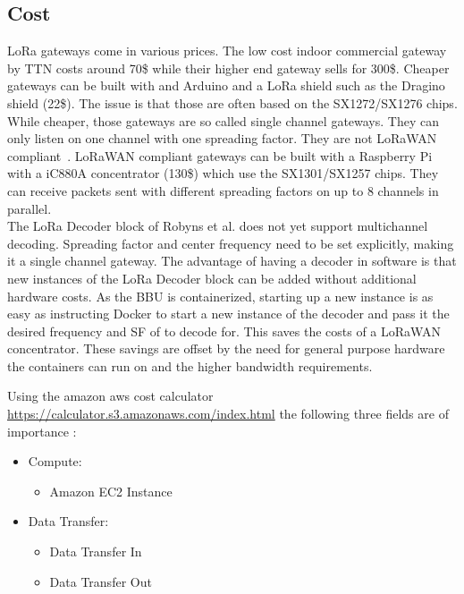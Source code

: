 \subsection{Cost}
LoRa gateways come in various prices. The low cost indoor commercial gateway by TTN costs around 70\$ while their higher end 
gateway sells for 300\$. Cheaper gateways can be built with and Arduino and a LoRa shield such as the Dragino shield (22\$).
The issue is that those are often based on the SX1272/SX1276 chips. While cheaper, those gateways are so called single channel 
gateways. They can only listen on one channel with one spreading factor. They are not LoRaWAN compliant~\cite{single_chan_gate}.
LoRaWAN compliant gateways can be built with a Raspberry Pi with a iC880A concentrator (130\$) which use the SX1301/SX1257 chips.
They can receive packets sent with different spreading factors on up to 8 channels in parallel.
\\
The LoRa Decoder block of Robyns et al. does not yet support multichannel decoding. Spreading factor and center frequency
need to be set explicitly, making it a single channel gateway. The advantage of having a decoder in software is that new instances 
of the LoRa Decoder block can be added without additional hardware costs. As the BBU is containerized, starting up a new instance 
is as easy as instructing Docker to start a new instance of the decoder and pass it the desired frequency and SF of to decode for. This saves the costs of 
a LoRaWAN concentrator.
These savings are offset by the need for general purpose hardware the containers can run on and the higher bandwidth requirements.

Using the amazon aws cost calculator \url{https://calculator.s3.amazonaws.com/index.html} the following three fields are of importance : 
\begin{itemize}
    \item Compute:
    \begin{itemize}
        \item  Amazon EC2 Instance
    \end{itemize}
    \item  Data Transfer:
    \begin{itemize}
        \item Data Transfer In
        \item Data Transfer Out  
    \end{itemize}
\end{itemize}


